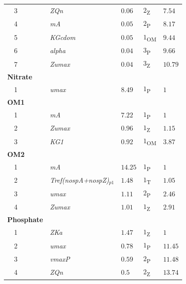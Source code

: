 \documentclass[letterpaper,12pt,oneside]{article}\usepackage[]{graphicx}\usepackage[]{color}
\begin{document}
\begin{table}[!tbp]
{\begin{center}
\begin{tabular}{lllll}
~~3&\scriptsize{\textit{ZQn}}&$0.06$&$2$\textsubscript{Z}&$7.54$\tabularnewline
~~4&\scriptsize{\textit{mA}}&$0.05$&$2$\textsubscript{P}&$8.17$\tabularnewline
~~5&\scriptsize{\textit{KGcdom}}&$0.05$&$1$\textsubscript{OM}&$9.44$\tabularnewline
~~6&\scriptsize{\textit{alpha}}&$0.04$&$3$\textsubscript{P}&$9.66$\tabularnewline
~~7&\scriptsize{\textit{Zumax}}&$0.04$&$3$\textsubscript{Z}&$10.79$\tabularnewline
\hline
{\bfseries Nitrate}&&&&\tabularnewline
~~1&\scriptsize{\textit{umax}}&$8.49$&$1$\textsubscript{P}&$1$\tabularnewline
\hline
{\bfseries OM1}&&&&\tabularnewline
~~1&\scriptsize{\textit{mA}}&$7.22$&$1$\textsubscript{P}&$1$\tabularnewline
~~2&\scriptsize{\textit{Zumax}}&$0.96$&$1$\textsubscript{Z}&$1.15$\tabularnewline
~~3&\scriptsize{\textit{KG1}}&$0.92$&$1$\textsubscript{OM}&$3.87$\tabularnewline
\hline
{\bfseries OM2}&&&&\tabularnewline
~~1&\scriptsize{\textit{mA}}&$14.25$&$1$\textsubscript{P}&$1$\tabularnewline
~~2&\scriptsize{\textit{Tref(nospA+nospZ)$_{p1}$}}&$1.48$&$1$\textsubscript{T}&$1.05$\tabularnewline
~~3&\scriptsize{\textit{umax}}&$1.11$&$2$\textsubscript{P}&$2.46$\tabularnewline
~~4&\scriptsize{\textit{Zumax}}&$1.01$&$1$\textsubscript{Z}&$2.91$\tabularnewline
\hline
{\bfseries Phosphate}&&&&\tabularnewline
~~1&\scriptsize{\textit{ZKa}}&$1.47$&$1$\textsubscript{Z}&$1$\tabularnewline
~~2&\scriptsize{\textit{umax}}&$0.78$&$1$\textsubscript{P}&$11.45$\tabularnewline
~~3&\scriptsize{\textit{vmaxP}}&$0.59$&$2$\textsubscript{P}&$11.48$\tabularnewline
~~4&\scriptsize{\textit{ZQn}}&$0.5$&$2$\textsubscript{Z}&$13.74$\tabularnewline
\hline
\end{tabular}\end{center}}

\end{table}
\end{document}

